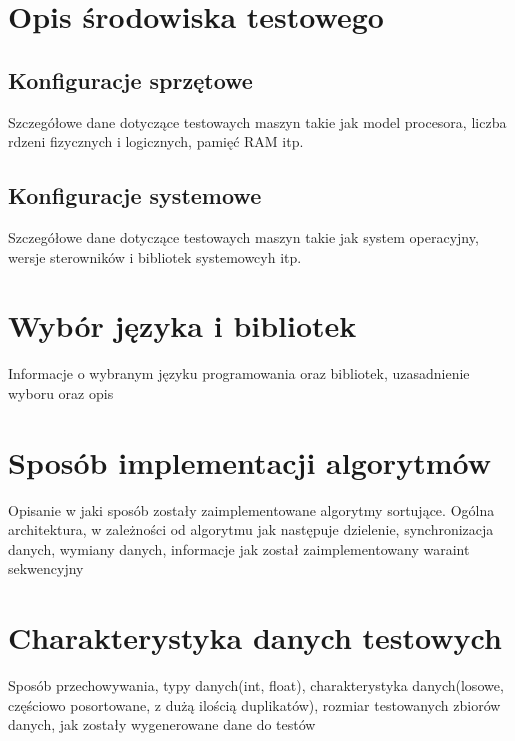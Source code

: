\documentclass{PracaDyplomowa-Szablon}
\begin{document}
\section{Opis środowiska testowego}
\label{sec:SrodowiskaTestowe}

\subsection{Konfiguracje sprzętowe}
\label{subsec:KonfiguracjeSprzetowe}

Szczegółowe dane dotyczące testowaych maszyn takie jak model procesora, liczba rdzeni fizycznych i logicznych, pamięć RAM itp.

\subsection{Konfiguracje systemowe}
\label{subsec:KonfiguracjeSystemowe}

Szczegółowe dane dotyczące testowaych maszyn takie jak system operacyjny, wersje sterowników i bibliotek systemowcyh itp.

\section{Wybór języka i bibliotek}
\label{sec:JezykBiblioteki}

Informacje o wybranym języku programowania oraz bibliotek, uzasadnienie wyboru oraz opis 

\section{Sposób implementacji algorytmów}
\label{sec:ImplementacjaAlgorytmow}

Opisanie w jaki sposób zostały zaimplementowane algorytmy sortujące. Ogólna architektura, w zależności od algorytmu jak następuje dzielenie, synchronizacja danych, wymiany danych, informacje jak został zaimplementowany waraint sekwencyjny

\section{Charakterystyka danych testowych}
\label{sec:DaneTestowane}

Sposób przechowywania, typy danych(int, float), charakterystyka danych(losowe, częściowo posortowane, z dużą ilością duplikatów), rozmiar testowanych zbiorów danych, jak zostały wygenerowane dane do testów
\end{document}
